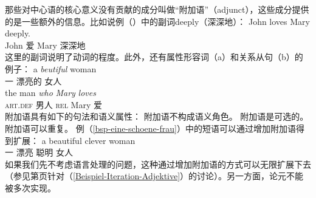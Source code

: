 那些对中心语的核心意义没有贡献的成分叫做“附加语”（adjunct），这些成分提供的是一些额外的信息。比如说例（）中的副词deeply（深深地）：
\ea
\gll John loves Mary deeply. \\
     John 爱 Mary 深深地 \\
\z
这里的副词说明了动词的程度。此外，还有属性形容词（a）和关系从句（b）的例子：
\eal
\ex\label{bsp-eine-schoene-frau}
\gll a {\em beutiful\/} woman\\
一 漂亮的 女人\\
\ex 
\gll the man {\em who\/} {\em Mary\/} {\em loves\/}\\
      \textsc{art}.\textsc{def}  男人 \textsc{rel} Mary  爱\\
\zl
附加语具有如下的句法和语义属性：
\eal
\label{adj-kriterien}
\ex 附加语不构成语义角色。
\ex 附加语是可选的。
\ex 附加语可以重复。
\zl
例（\ref{bsp-eine-schoene-frau}）中的短语可以通过增加附加语得到扩展：
\ea
\gll a beautiful clever woman \\
     一 漂亮 聪明 女人 \\
\z
如果我们先不考虑语言处理的问题，这种通过增加附加语的方式可以无限扩展下去（参见第\pageref{Beispiel-Iteration-Adjektive}页针对（\ref{Beispiel-Iteration-Adjektive}）的讨论）。另一方面，论元不能被多次实现。
\z

